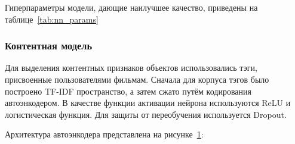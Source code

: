 Гиперпараметры модели, дающие наилучшее качество, приведены на таблице~\ref{tab:nn_params}
\begin{table}[h]
    \caption{Гиперпараметры нейросети}
    \label{tab:nn_params}
\end{table}

\pagebreak
\subsubsection{Контентная модель}
Для выделения контентных признаков объектов использовались тэги, присвоенные пользователями фильмам.
Сначала для корпуса тэгов было построено TF-IDF пространство, а затем сжато путём кодирования автоэнкодером.
В качестве функции активации нейрона используются ReLU и логистическая функция.
Для защиты от переобучения используется Dropout.

Архитектура автоэнкодера представлена на рисунке~\ref{fig:autoencoder}:
\begin{figure}[h!]
    \caption{}
    \label{fig:autoencoder}
\end{figure}

